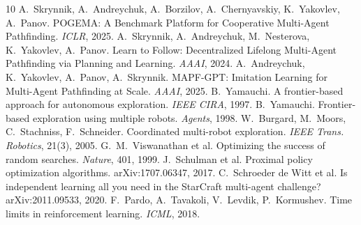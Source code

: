 \documentclass[10pt]{article}
\begin{document}
\small
\begin{thebibliography}{10}
 A.~Skrynnik, A.~Andreychuk, A.~Borzilov, A.~Chernyavskiy, K.~Yakovlev, A.~Panov.
POGEMA: A Benchmark Platform for Cooperative Multi-Agent Pathfinding. \emph{ICLR}, 2025.
 A.~Skrynnik, A.~Andreychuk, M.~Nesterova, K.~Yakovlev, A.~Panov. Learn to Follow:
Decentralized Lifelong Multi-Agent Pathfinding via Planning and Learning. \emph{AAAI}, 2024.
 A.~Andreychuk, K.~Yakovlev, A.~Panov, A.~Skrynnik. MAPF-GPT: Imitation Learning for
Multi-Agent Pathfinding at Scale. \emph{AAAI}, 2025.
 B.~Yamauchi. A frontier-based approach for autonomous exploration. \emph{IEEE CIRA}, 1997.
 B.~Yamauchi. Frontier-based exploration using multiple robots. \emph{Agents}, 1998.
 W.~Burgard, M.~Moors, C.~Stachniss, F.~Schneider. Coordinated multi-robot exploration.
\emph{IEEE Trans. Robotics}, 21(3), 2005.
 G.~M.~Viswanathan et al. Optimizing the success of random searches. \emph{Nature}, 401, 1999.
 J.~Schulman et al. Proximal policy optimization algorithms. arXiv:1707.06347, 2017.
 C.~Schroeder de Witt et al. Is independent learning all you need in the StarCraft
multi-agent challenge? arXiv:2011.09533, 2020.
 F.~Pardo, A.~Tavakoli, V.~Levdik, P.~Kormushev. Time limits in reinforcement learning. \emph{ICML}, 2018.
\end{thebibliography}
\end{document}
